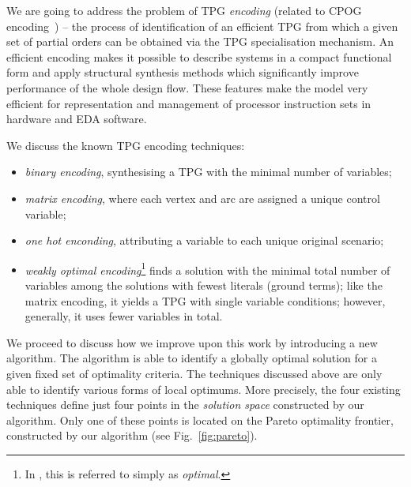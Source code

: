 We are going to address the problem of TPG \emph{encoding} (related to CPOG encoding~\cite{2009_mokhov_phd}) -- the process of identification of an efficient TPG from which a given set of partial orders can be obtained via the TPG specialisation mechanism. An efficient encoding makes it possible to describe systems in
a compact functional form and apply structural synthesis methods which
significantly improve performance of the whole design flow. These
features make the model very efficient for representation and management
of processor instruction sets in hardware and EDA software. 

We discuss the known TPG encoding techniques:
\begin{itemize}
\item \emph{binary encoding}, synthesising a TPG with the minimal number of variables;
\item \emph{matrix encoding}, where each vertex and arc are assigned a unique control variable;
\item \emph{one hot enconding}, attributing a variable to each unique original scenario;
\item \emph{weakly optimal encoding}\footnote{In \cite{2009_mokhov_phd}, this is referred to simply as \emph{optimal}.} finds a solution with the minimal total number of variables among the solutions with fewest literals (ground terms); like the matrix encoding, it yields a TPG with single variable conditions; however, generally, it uses fewer variables in total.    
\end{itemize}

We proceed to discuss how we improve upon this work by introducing a new algorithm. The algorithm is able to identify a globally optimal solution for a given fixed set of optimality criteria. The techniques discussed above are only able to identify various forms of local optimums. More precisely, the four existing techniques define just four points in the \emph{solution space} constructed by our algorithm. Only one of these points is located on the Pareto optimality frontier, constructed by our algorithm (see Fig.~\ref{fig:pareto}).

